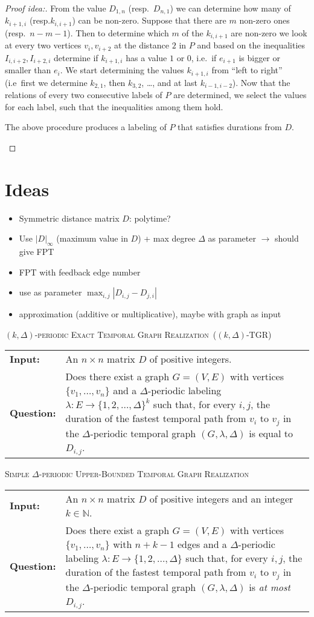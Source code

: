\documentclass[a4paper,UKenglish,cleveref, autoref, thm-restate]{lipics-v2021}
\makeatletter
\newcommand{\problemdef}[3]{
	\begin{center}
		\begin{minipage}{0.95\textwidth}
			\noindent
			#1
			\vspace{5pt}\\
			\setlength{\tabcolsep}{3pt}
			\begin{tabularx}{\textwidth}{@{}lX@{}}
				\textbf{Input:}& #2 \\
				\textbf{Question:}& #3
			\end{tabularx}
		\end{minipage}
	\end{center}
}
\newcommand{\kDeltaExactLong}{\textsc{$(k,\Delta)$-periodic Exact Temporal Graph Realization}}
\newcommand{\kDeltaExact}{\textsc{$(k,\Delta)$-TGR}}
\newcommand{\DeltaUpperBoundLong}{\textsc{Simple $\Delta$-periodic Upper-Bounded Temporal Graph Realization}}
\makeatother
\begin{document}
\begin{proof}[Proof idea:]
	From the value $D_{1,n}$ (resp.~$D_{n,1}$) we can determine how many of $k_{i+1,i}$ (resp.$k_{i,i+1}$) can be non-zero. Suppose that there are $m$ non-zero ones (resp.~$n-m-1$).
	Then to determine which $m$ of the $k_{i,i+1}$ are non-zero we look at every two vertices $v_i, v_{i+2}$ at the distance $2$ in $P$ 
	and based on the inequalities $I_{i,i+2}, I_{i+2,i}$ determine if $k_{i+1,i}$ has a value $1$ or $0$,
	i.e.~if $e_{i+1}$ is bigger or smaller than $e_i$.
	We start determining the values $k_{i+1,i}$ from ``left to right'' (i.e~first we determine $k_{2,1}$, then $k_{3,2}$, \dots, and at last $k_{i-1,i-2}$).
	Now that the relations of every two consecutive labels of $P$ are determined, 
	we select the values for each label, such that the inequalities among them hold.
	\begin{claim}
		The above procedure produces a labeling of $P$ that satisfies durations from $D$.
	\end{claim}
\end{proof}
	
	
\clearpage

\section{Ideas}
\begin{itemize}
    \item Symmetric distance matrix $D$: polytime?
    \item Use $|D|_\infty$ (maximum value in $D$) + max degree $\Delta$ as parameter $\rightarrow$ should give FPT
    \item FPT with feedback edge number
    \item use as parameter $\max_{i,j} |D_{i,j}-D_{j,i}|$
    \item approximation (additive or multiplicative), maybe with graph as input
\end{itemize}

\problemdef{\kDeltaExactLong\ (\kDeltaExact)}
{An $n \times n$ matrix $D$ of positive integers.}
{Does there exist a graph $G=(V,E)$ with vertices $\{v_1,\ldots,v_{n}\}$ 
and a $\Delta$-periodic labeling $\lambda: E \rightarrow \{1,2,\ldots,\Delta\}^k$ such that, 
for every $i,j$, the duration of the fastest temporal path from $v_i$ to $v_j$ in the $\Delta$-periodic temporal graph $(G,\lambda,\Delta)$ is equal to $D_{i,j}$.}

\problemdef{\DeltaUpperBoundLong}
{An $n \times n$ matrix $D$ of positive integers and an integer $k\in \mathbb{N}$.}
{Does there exist a graph $G=(V,E)$ with vertices $\{v_1,\ldots,v_{n}\}$ with $n+k-1$ edges 
	and a $\Delta$-periodic labeling $\lambda: E \rightarrow \{1,2,\ldots,\Delta\}$ such that, 
	for every $i,j$, the duration of the fastest temporal path from $v_i$ to $v_j$ in the $\Delta$-periodic temporal graph $(G,\lambda,\Delta)$ is \emph{at most} $D_{i,j}$.}
\end{document}
